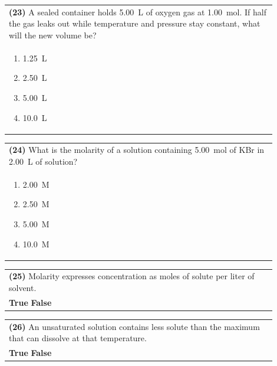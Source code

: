 \documentclass{article}
\begin{document}
{{\vspace{0.2cm}
\noindent\begin{tabular}{|p{0.9\linewidth}|}
\hline
\textbf{(23)} A sealed container holds 5.00~L of oxygen gas at 1.00~mol. If half the gas leaks out while temperature and pressure stay constant, what will the new volume be?\\[0.2cm]
\begin{minipage}[t]{0.85\linewidth}
\begin{enumerate}[label=\alph*.]
\item 1.25~L
\item 2.50~L
\item 5.00~L
\item 10.0~L
\end{enumerate}
\end{minipage}\\[0.2cm]
\hline
\end{tabular}

\vspace{0.2cm}
\noindent\begin{tabular}{|p{0.9\linewidth}|}
\hline
\textbf{(24)} What is the molarity of a solution containing 5.00~mol of KBr in 2.00~L of solution?\\[0.2cm]
\begin{minipage}[t]{0.85\linewidth}
\begin{enumerate}[label=\alph*.]
\item 2.00~M
\item 2.50~M
\item 5.00~M
\item 10.0~M
\end{enumerate}
\end{minipage}\\[0.2cm]
\hline
\end{tabular}
\newpage

\vspace{0.2cm}
\noindent\begin{tabular}{|p{0.9\linewidth}|}
\hline
\textbf{(25)} Molarity expresses concentration as moles of solute per liter of solvent.\\[0.2cm]
\textbf{True} \hspace{1cm} \textbf{False}\\[0.2cm]
\hline
\end{tabular}

\vspace{0.2cm}
\noindent\begin{tabular}{|p{0.9\linewidth}|}
\hline
\textbf{(26)} An unsaturated solution contains less solute than the maximum that can dissolve at that temperature.\\[0.2cm]
\textbf{True} \hspace{1cm} \textbf{False}\\[0.2cm]
\hline
\end{tabular}

}}
\end{document}
